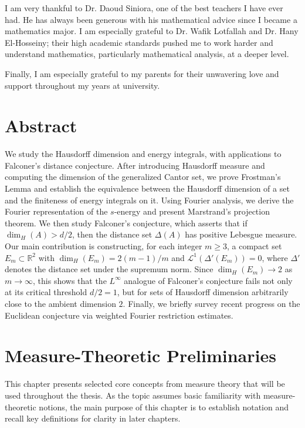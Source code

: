 \documentclass[12pt,a4paper]{report}
\theoremstyle{definition}
\begin{document}
I am very thankful to Dr. Daoud Siniora, one of the best teachers I have ever had. He has always been generous with his mathematical advice since I became a mathematics major. I am especially grateful to Dr. Wafik Lotfallah and Dr. Hany El-Hosseiny; their high academic standards pushed me to work harder and understand mathematics, particularly mathematical analysis, at a deeper level.

Finally, I am especially grateful to my parents for their unwavering love and support throughout my years at university.


\chapter*{Abstract}

We study the Hausdorff dimension and energy integrals, with applications to Falconer's distance conjecture. After introducing Hausdorff measure and computing the dimension of the generalized Cantor set, we prove Frostman's Lemma and establish the equivalence between the Hausdorff dimension of a set and the finiteness of energy integrals on it. Using Fourier analysis, we derive the Fourier representation of the $s$-energy and present Marstrand's projection theorem. We then study Falconer's conjecture, which asserts that if $\dim_H(A) > d/2$, then the distance set $\Delta(A)$ has positive Lebesgue measure. Our main contribution is constructing, for each integer $m \geq 3$, a compact set $E_m \subset \mathbb{R}^2$ with $\dim_H(E_m) = 2(m-1)/m$ and $\mathcal{L}^1(\Delta'(E_m)) = 0$, where $\Delta'$ denotes the distance set under the supremum norm. Since $\dim_H(E_m) \to 2$ as $m \to \infty$, this shows that the $L^\infty$ analogue of Falconer's conjecture fails not only at its critical threshold $d/2 = 1$, but for sets of Hausdorff dimension arbitrarily close to the ambient dimension $2$. Finally, we briefly survey recent progress on the Euclidean conjecture via weighted Fourier restriction estimates.


\renewcommand{\thepage}{\arabic{page}}
\tableofcontents


\clearpage
{}
\justifying

\chapter{Measure-Theoretic Preliminaries}
This chapter presents selected core concepts from measure theory that will be used throughout the thesis. As the topic assumes basic familiarity with measure-theoretic notions, the main purpose of this chapter is to establish notation and recall key definitions for clarity in later chapters. \\
\end{document}
